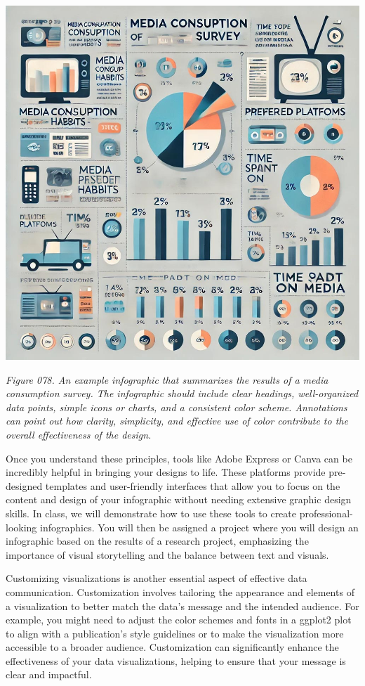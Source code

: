 \documentclass[
]{book}
\begin{document}
\includegraphics[width=1\linewidth,height=\textheight,keepaspectratio]{images/fig078.jpg}

\emph{Figure 078. An example infographic that summarizes the results of a media consumption survey. The infographic should include clear headings, well-organized data points, simple icons or charts, and a consistent color scheme. Annotations can point out how clarity, simplicity, and effective use of color contribute to the overall effectiveness of the design.}

Once you understand these principles, tools like Adobe Express or Canva can be incredibly helpful in bringing your designs to life. These platforms provide pre-designed templates and user-friendly interfaces that allow you to focus on the content and design of your infographic without needing extensive graphic design skills. In class, we will demonstrate how to use these tools to create professional-looking infographics. You will then be assigned a project where you will design an infographic based on the results of a research project, emphasizing the importance of visual storytelling and the balance between text and visuals.

Customizing visualizations is another essential aspect of effective data communication. Customization involves tailoring the appearance and elements of a visualization to better match the data's message and the intended audience. For example, you might need to adjust the color schemes and fonts in a ggplot2 plot to align with a publication's style guidelines or to make the visualization more accessible to a broader audience. Customization can significantly enhance the effectiveness of your data visualizations, helping to ensure that your message is clear and impactful.
\end{document}
